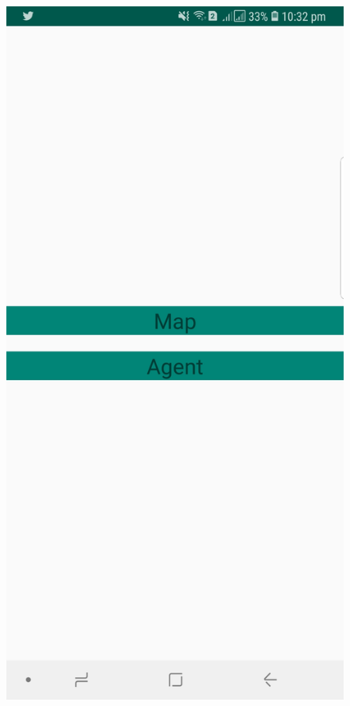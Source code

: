 \documentclass{scrreprt}
\begin{document}
  \begin{figure}[ht!]
    \centering
    \includegraphics[height=0.6\textheight]{AppDesign/actualDesign/AppMain.jpg}
    \qquad

\end{figure}
\end{document}
